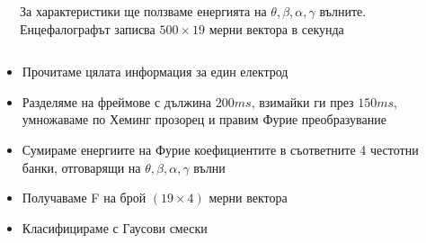 \documentclass[9pt]{beamer}
\begin{document}
    \begin{frame}[t]
        \begin{columns}
            \begin{column}{0.48\textwidth}
            \end{column}
            \begin{column}{0.48\textwidth}
                \pause
                За характеристики ще ползваме енергията на  $\theta, \beta, \alpha, \gamma$ вълните.
                \pause
                Енцефалографът записва $500\times19$ мерни вектора в секунда
            \end{column}
        \end{columns}
        \begin{itemize}
            \setlength\itemsep{\fill}
            \pause
            \item Прочитаме цялата информация за един електрод
            \pause
            \item Разделяме на фреймове с дължина $200ms$, взимайки ги през $150ms$, умножаваме по Хеминг прозорец и правим Фурие преобразувание
            \pause
            \item Сумираме енергиите на Фурие коефициентите в съответните 4 честотни банки, отговарящи на $\theta, \beta, \alpha, \gamma$ вълни
            \pause
            \item Получаваме F на брой $(19\times 4)$ мерни вектора
            \pause
            \item Класифицираме с Гаусови смески
        \end{itemize}
    \end{frame}
\end{document}
